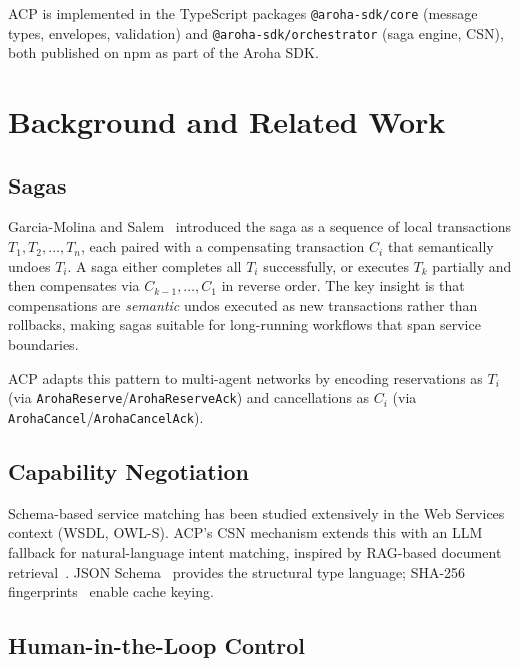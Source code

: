 \documentclass[conference]{IEEEtran}
\begin{document}
ACP is implemented in the TypeScript packages
\texttt{@aroha-sdk/core} (message types, envelopes, validation) and
\texttt{@aroha-sdk/orchestrator} (saga engine, CSN), both published
on npm as part of the Aroha SDK.

\section{Background and Related Work}
\label{sec:background}

\subsection{Sagas}

Garcia-Molina and Salem~\cite{garcia1987sagas} introduced the saga as
a sequence of local transactions $T_1, T_2, \ldots, T_n$, each paired
with a compensating transaction $C_i$ that semantically undoes $T_i$.
A saga either completes all $T_i$ successfully, or executes $T_k$
partially and then compensates via $C_{k-1}, \ldots, C_1$ in reverse
order.  The key insight is that compensations are \emph{semantic}
undos executed as new transactions rather than rollbacks, making sagas
suitable for long-running workflows that span service boundaries.

ACP adapts this pattern to multi-agent networks by encoding
reservations as $T_i$ (via \texttt{ArohaReserve}/\texttt{ArohaReserveAck})
and cancellations as $C_i$ (via \texttt{ArohaCancel}/\texttt{ArohaCancelAck}).

\subsection{Capability Negotiation}

Schema-based service matching has been studied extensively in the
Web Services context (WSDL, OWL-S).  ACP's CSN mechanism extends this
with an LLM fallback for natural-language intent matching, inspired by
RAG-based document retrieval~\cite{lewis2020rag,karpukhin2020dpr}.
JSON Schema~\cite{w3cjsonschema} provides the structural type language;
SHA-256 fingerprints~\cite{jsoncanon} enable cache keying.

\subsection{Human-in-the-Loop Control}
\end{document}
